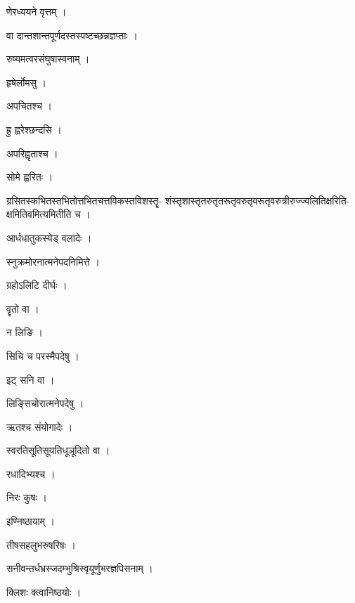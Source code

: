 \documentclass[10pt, openany]{book}
\begin{document}
\noindent णेरध्ययने वृत्तम् ।

\noindent वा दान्तशान्तपूर्णदस्तस्पष्टच्छन्नज्ञप्ताः ।

\noindent रुष्यमत्वरसंघुषास्वनाम् ।

\noindent हृषेर्लोमसु ।

\noindent अपचितश्च ।

\noindent ह्रु ह्वरेश्छन्दसि ।

\noindent अपरिह्वृताश्च ।

\noindent सोमे ह्वरितः ।

\noindent ग्रसितस्कभितस्तभितोत्तभितचत्तविकस्तविशस्तॄ- शंस्तृशास्तृतरुतृतरूतृवरुतृवरूतृवरुत्रीरुज्ज्वलितिक्षरिति- क्षमितिवमित्यमितीति च ।

\noindent आर्धधातुकस्येड् वलादेः ।

\noindent स्नुक्रमोरनात्मनेपदनिमित्ते ।

\noindent ग्रहोऽलिटि दीर्घः ।

\noindent वॄतो वा ।

\noindent न लिङि ।

\noindent सिचि च परस्मैपदेषु ।

\noindent इट् सनि वा ।

\noindent लिङ्सिचोरात्मनेपदेषु ।

\noindent ऋतश्च संयोगादेः ।

\noindent स्वरतिसूतिसूयतिधूञूदितो वा ।

\noindent रधादिभ्यश्च ।

\noindent निरः कुषः ।

\noindent इण्निष्ठायाम् ।

\noindent तीषसहलुभरुषरिषः ।

\noindent सनीवन्तर्धभ्रस्जदम्भुश्रिस्वृयूर्णुभरज्ञपिसनाम् ।

\noindent क्लिशः क्त्वानिष्ठयोः ।
\end{document}
